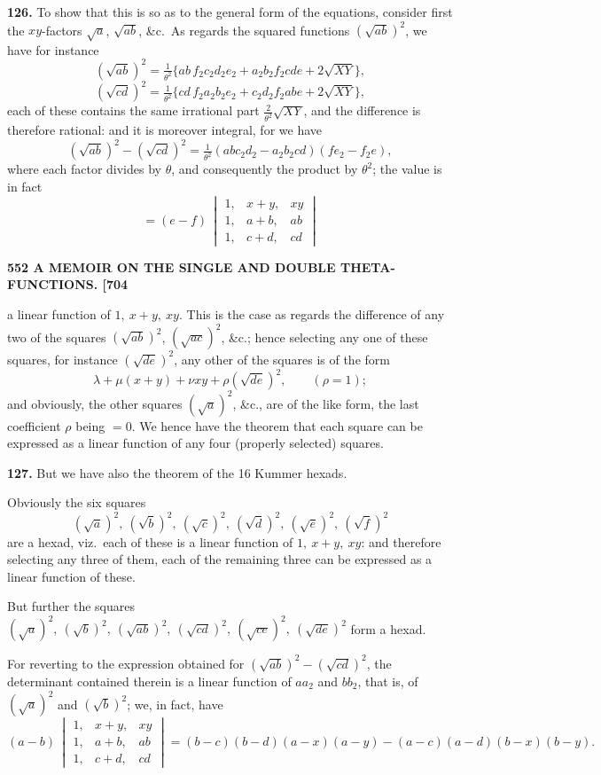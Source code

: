 \documentclass[11pt]{article}
\begin{document}
\medskip
\textbf{126.} To show that this is so as to the general form of the equations, consider first the $xy$-factors $\sqrt{a}$, $\sqrt{ab}$, \&c.\ As regards the squared functions $(\sqrt{ab})^2$, we have for instance
\[
(\sqrt{ab})^2 = \tfrac{1}{\theta^2}\bigl\{ab\,f_2c_2d_2e_2 + a_2b_2f_2cde + 2\sqrt{XY}\bigr\},
\]
\[
(\sqrt{cd})^2 = \tfrac{1}{\theta^2}\bigl\{cd\,f_2a_2b_2e_2 + c_2d_2f_2abe + 2\sqrt{XY}\bigr\},
\]
each of these contains the same irrational part $\tfrac{2}{\theta^2}\sqrt{XY}$, and the difference is therefore rational: and it is moreover integral, for we have
\[
(\sqrt{ab})^2 - (\sqrt{cd})^2 = \tfrac{1}{\theta^2}(abc_2d_2 - a_2b_2cd)(fe_2 - f_2e),
\]
where each factor divides by $\theta$, and consequently the product by $\theta^2$; the value is in fact
\[
= (e-f)\,\begin{vmatrix} 1, & x+y, & xy\\ 1, & a+b, & ab\\ 1, & c+d, & cd \end{vmatrix}
\]

\newpage
\noindent\textbf{552 \hfill A MEMOIR ON THE SINGLE AND DOUBLE THETA-FUNCTIONS. \hfill [704}

\medskip
a linear function of $1,\ x+y,\ xy$. This is the case as regards the difference of any two of the squares $(\sqrt{ab})^2$, $(\sqrt{ac})^2$, \&c.; hence selecting any one of these squares, for instance $(\sqrt{de})^2$, any other of the squares is of the form
\[
\lambda + \mu(x+y) + \nu xy + \rho(\sqrt{de})^2,\qquad (\rho = 1);
\]
and obviously, the other squares $(\sqrt{a})^2$, \&c., are of the like form, the last coefficient $\rho$ being $=0$. We hence have the theorem that each square can be expressed as a linear function of any four (properly selected) squares.

\medskip
\textbf{127.} But we have also the theorem of the 16 Kummer hexads.

\medskip
Obviously the six squares
\[
(\sqrt{a})^2,\ (\sqrt{b})^2,\ (\sqrt{c})^2,\ (\sqrt{d})^2,\ (\sqrt{e})^2,\ (\sqrt{f})^2
\]
are a hexad, viz.\ each of these is a linear function of $1,\ x+y,\ xy$: and therefore selecting any three of them, each of the remaining three can be expressed as a linear function of these.

\medskip
But further the squares $(\sqrt{a})^2,\ (\sqrt{b})^2,\ (\sqrt{ab})^2,\ (\sqrt{cd})^2,\ (\sqrt{ce})^2,\ (\sqrt{de})^2$ form a hexad.

\medskip
For reverting to the expression obtained for $(\sqrt{ab})^2 - (\sqrt{cd})^2$, the determinant contained therein is a linear function of $aa_2$ and $bb_2$, that is, of $(\sqrt{a})^2$ and $(\sqrt{b})^2$; we, in fact, have
\[
(a-b)\,\begin{vmatrix} 1, & x+y, & xy\\ 1, & a+b, & ab\\ 1, & c+d, & cd \end{vmatrix} = (b-c)(b-d)(a-x)(a-y) - (a-c)(a-d)(b-x)(b-y).
\]
\end{document}
